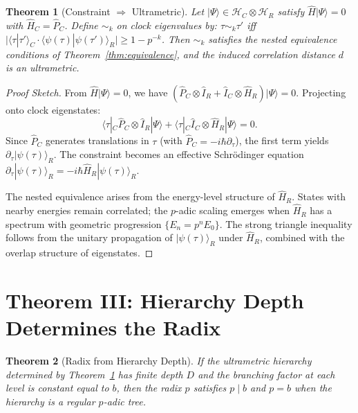 \documentclass[12pt,a4paper]{article}
\newtheorem{theorem}{Theorem}[section]
\newcommand{\cH}{\mathcal{H}}
\newcommand{\abs}[1]{\lvert#1\rvert}
\newcommand{\ket}[1]{|#1\rangle}
\newcommand{\braket}[2]{\langle #1 | #2 \rangle}
\begin{document}
\begin{theorem}[Constraint $\Rightarrow$ Ultrametric]\label{thm:constraint}
Let $\ket{\Psi} \in \cH_C \otimes \cH_R$ satisfy $\hat{H}\ket{\Psi}=0$ with $\hat{H}_C = \hat{P}_C$. Define $\sim_k$ on clock eigenvalues by: $\tau \sim_k \tau'$ iff $\abs{\langle\tau|\tau'\rangle_C \cdot \braket{\psi(\tau)}{\psi(\tau')}_R} \ge 1 - p^{-k}$. Then $\sim_k$ satisfies the nested equivalence conditions of Theorem~\ref{thm:equivalence}, and the induced correlation distance $d$ is an ultrametric.
\end{theorem}

\begin{proof}[Proof Sketch]
From $\hat{H}\ket{\Psi}=0$, we have $(\hat{P}_C \otimes \hat{I}_R + \hat{I}_C \otimes \hat{H}_R)\ket{\Psi}=0$. Projecting onto clock eigenstates:
\begin{equation}
\langle\tau|_C \hat{P}_C \otimes \hat{I}_R \ket{\Psi} + \langle\tau|_C \hat{I}_C \otimes \hat{H}_R \ket{\Psi} = 0.
\end{equation}
Since $\hat{P}_C$ generates translations in $\tau$ (with $\hat{P}_C = -i\hbar \partial_\tau$), the first term yields $\partial_\tau \ket{\psi(\tau)}_R$. The constraint becomes an effective Schr\"odinger equation $\partial_\tau \ket{\psi(\tau)}_R = -i\hbar \hat{H}_R \ket{\psi(\tau)}_R$.

The nested equivalence arises from the energy-level structure of $\hat{H}_R$. States with nearby energies remain correlated; the $p$-adic scaling emerges when $\hat{H}_R$ has a spectrum with geometric progression $\{E_n = p^n E_0\}$. The strong triangle inequality follows from the unitary propagation of $\ket{\psi(\tau)}_R$ under $\hat{H}_R$, combined with the overlap structure of eigenstates.
\end{proof}

\section{Theorem III: Hierarchy Depth Determines the Radix}

\begin{theorem}[Radix from Hierarchy Depth]\label{thm:radix}
If the ultrametric hierarchy determined by Theorem~\ref{thm:constraint} has finite depth $D$ and the branching factor at each level is constant equal to $b$, then the radix $p$ satisfies $p \mid b$ and $p = b$ when the hierarchy is a regular $p$-adic tree.
\end{theorem}
\end{document}
